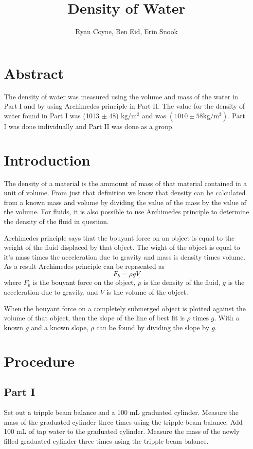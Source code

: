 \documentclass[12pt]{article}
\begin{document}
    \title{Density of Water}
    \author{Ryan Coyne, Ben Eid, Erin Snook}
    \maketitle
    \section{Abstract}
        The density of water was measured using the volume and mass of the water in Part I and by using Archimedes principle in Part II. The value for the density of water found in Part I was (1013 \(\pm\) 48) \(\mathrm{kg/m^3}\) and was \((1010 \pm 58 \mathrm{kg/m^3})\). Part I was done individually and Part II was done as a group.
    \section{Introduction}
        The density of a material is the ammount of mass of that material contained in a unit of volume. From just that definition we know that density can be calculated from a known mass and volume by dividing the value of the mass by the value of the volume. For fluids, it is also possible to use Archimedes principle to determine the density of the fluid in question. 

        Archimedes principle says that the bouyant force on an object is equal to the weight of the fluid displaced by that object. The wight of the object is equal to it's mass times the acceleration due to gravity and mass is density times volume. As a result Archimedes principle can be reprsented as
        \begin{equation*}
            F_b = \rho g V
        \end{equation*}
        where \(F_b\) is the bouyant force on the object, \(\rho\) is the density of the fluid, \(g\) is the acceleration due to gravity, and \(V\) is the volume of the object.

        When the bouyant force on a completely submerged object is plotted against the volume of that object, then the slope of the line of best fit is \(\rho \text{ times } g\). With a known \(g\) and a known slope, \(\rho\) can be found by dividing the slope by \(g\).
    \section{Procedure}
        \subsection*{Part I}
        Set out a tripple beam balance and a 100 mL graduated cylinder. Measure the mass of the graduated cylinder three times using the tripple beam balance. Add 100 mL of tap water to the graduated cylinder. Measure the mass of the newly filled graduated cylinder three times using the tripple beam balance. 
\end{document}

